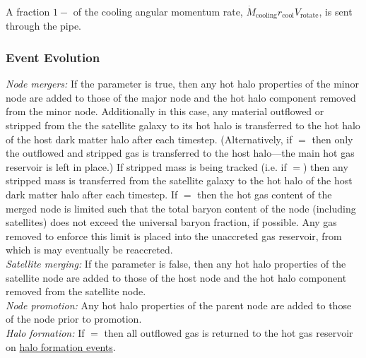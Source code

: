 A fraction $1-$\mono{[hotHaloAngularMomentumLossFraction]} of the cooling angular momentum rate, $\dot{M}_\mathrm{cooling} r_\mathrm{cool} V_\mathrm{rotate}$, is sent through the  pipe.

\subsubsection{Event Evolution}

\noindent\emph{Node mergers:} If the  parameter is true, then any hot halo properties of the minor \gls{node} are added to those of the major \gls{node} and the hot halo \gls{component} removed from the minor node. Additionally in this case, any material outflowed or stripped from the the satellite galaxy to its hot halo is transferred to the hot halo of the host dark matter halo after each timestep. (Alternatively, if $=$ then only the outflowed and stripped gas is transferred to the host halo---the main hot gas reservoir is left in place.) If stripped mass is being tracked (i.e. if \mono{[hotHaloTrackStrippedGas]}$=$) then any stripped mass is transferred from the satellite galaxy to the hot halo of the host dark matter halo after each timestep. If \mono{[hotHaloNodeMergerLimitBaryonFraction]}$=$ then the hot gas content of the merged node is limited such that the total baryon content of the node (including satellites) does not exceed the universal baryon fraction, if possible. Any gas removed to enforce this limit is placed into the unaccreted gas reservoir, from which is may eventually be reaccreted.\\

\noindent\emph{Satellite merging:} If the  parameter is false, then any hot halo properties of the satellite \gls{node} are added to those of the host \gls{node} and the hot halo \gls{component} removed from the satellite node.\\

\noindent\emph{Node promotion:} Any hot halo properties of the parent \gls{node} are added to those of the \gls{node} prior to promotion.\\

\noindent\emph{Halo formation:} If \mono{[hotHaloOutflowReturnOnFormation]}$=$ then all outflowed gas is returned to the hot gas reservoir on \href{https://github.com/galacticusorg/galacticus/releases/download/bleeding-edge/Galacticus_Development.pdf\#sec.HaloFormationEvents}{halo formation events}.\\

